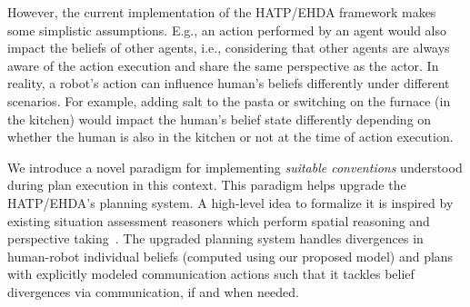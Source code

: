 \documentclass[letterpaper]{article} %
\begin{document}
However, the current implementation of the HATP/EHDA framework
makes some simplistic assumptions. E.g., an action performed by an agent would also impact the beliefs of other agents, i.e., considering that other agents are always aware of the action execution and share the same perspective as the actor. 
In reality, a robot's action can influence human's beliefs differently under different scenarios. For example, adding salt to the pasta or switching on the furnace (in the kitchen) would impact the human's belief state differently depending on whether the human is also in the kitchen or not at the time of action execution.   



We introduce a novel paradigm for implementing \textit{suitable conventions} understood during plan execution in this context. This paradigm helps upgrade the HATP/EHDA's planning system. 
A high-level idea to formalize it is inspired by existing situation assessment reasoners which perform spatial reasoning and perspective taking~\cite{flavell1992perspectives,trafton2005enabling,johnson2005perceptual,Sisbot2011SituationAF,warnier-2012,lemaignan-2017}. 
The upgraded planning system handles divergences in human-robot individual beliefs (computed using our proposed model) and plans with explicitly modeled communication actions such that it tackles belief divergences via communication, if and when needed.
\end{document}
